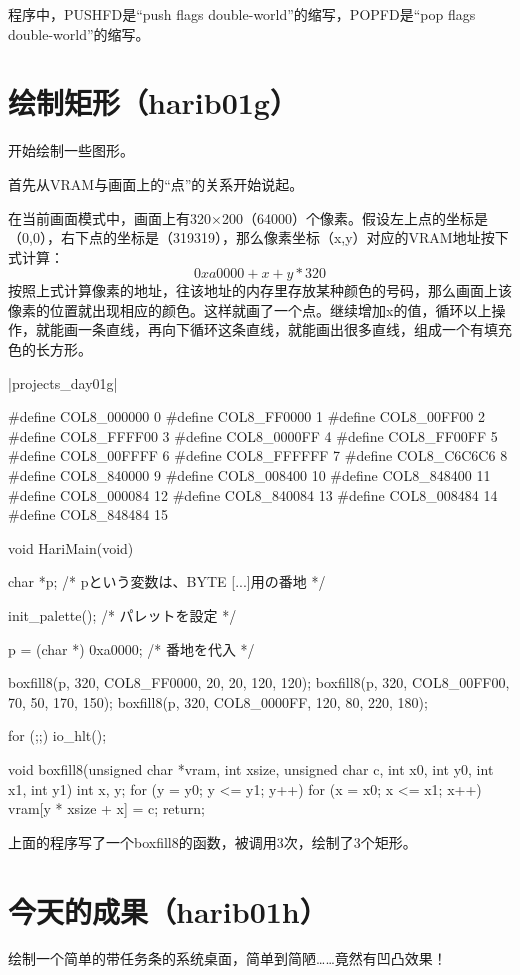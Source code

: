 程序中，PUSHFD是“push flags double-world”的缩写，POPFD是“pop flags double-world”的缩写。
\section{	绘制矩形（harib01g）	}
开始绘制一些图形。

首先从VRAM与画面上的“点”的关系开始说起。

在当前画面模式中，画面上有320$\times$200（64000）个像素。假设左上点的坐标是（0,0），右下点的坐标是（319319），那么像素坐标（x,y）对应的VRAM地址按下式计算：
\begin{equation*}
  0xa0000+x+y*320
\end{equation*}
按照上式计算像素的地址，往该地址的内存里存放某种颜色的号码，那么画面上该像素的位置就出现相应的颜色。这样就画了一个点。继续增加x的值，循环以上操作，就能画一条直线，再向下循环这条直线，就能画出很多直线，组成一个有填充色的长方形。

\dag|projects_day\harib01g|
\begin{code}[label=bootpack.c]
#define COL8_000000		0
#define COL8_FF0000		1
#define COL8_00FF00		2
#define COL8_FFFF00		3
#define COL8_0000FF		4
#define COL8_FF00FF		5
#define COL8_00FFFF		6
#define COL8_FFFFFF		7
#define COL8_C6C6C6		8
#define COL8_840000		9
#define COL8_008400		10
#define COL8_848400		11
#define COL8_000084		12
#define COL8_840084		13
#define COL8_008484		14
#define COL8_848484		15

void HariMain(void)
{
	char *p; /* pという変数は、BYTE [...]用の番地 */

	init_palette(); /* パレットを設定 */

	p = (char *) 0xa0000; /* 番地を代入 */

	boxfill8(p, 320, COL8_FF0000,  20,  20, 120, 120);
	boxfill8(p, 320, COL8_00FF00,  70,  50, 170, 150);
	boxfill8(p, 320, COL8_0000FF, 120,  80, 220, 180);

	for (;;) {
		io_hlt();
	}
}

void boxfill8(unsigned char *vram, int xsize, unsigned char c, int x0, int y0, int x1, int y1)
{
	int x, y;
	for (y = y0; y <= y1; y++) {
		for (x = x0; x <= x1; x++)
			vram[y * xsize + x] = c;
	}
	return;
}
\end{code}
上面的程序写了一个boxfill8的函数，被调用3次，绘制了3个矩形。
\section{	今天的成果（harib01h）	}
绘制一个简单的带任务条的系统桌面，简单到简陋……竟然有凹凸效果！

